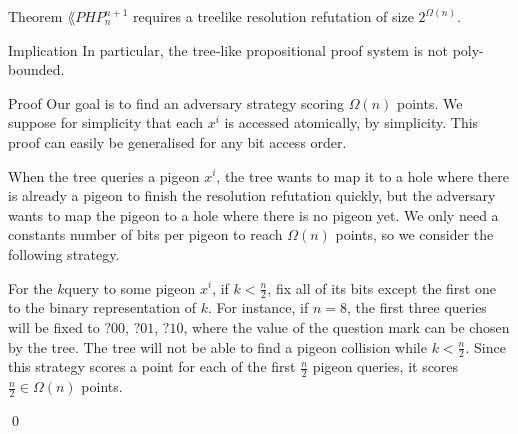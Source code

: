 \documentclass[a4paper]{article}
\begin{document}
\begin{parag}{Theorem}
    $\lang{PHP}_n^{n+1}$ requires a treelike resolution refutation of size $2^{\Omega\left(n\right)}$.

    \begin{subparag}{Implication}
        In particular, the tree-like propositional proof system is not poly-bounded.
    \end{subparag}

    \begin{subparag}{Proof}
        Our goal is to find an adversary strategy scoring $\Omega\left(n\right)$ points. We suppose for simplicity that each $x^i$ is accessed atomically, by simplicity. This proof can easily be generalised for any bit access order.

        When the tree queries a pigeon $x^i$, the tree wants to map it to a hole where there is already a pigeon to finish the resolution refutation quickly, but the adversary wants to map the pigeon to a hole where there is no pigeon yet. We only need a constants number of bits per pigeon to reach $\Omega\left(n\right)$ points, so we consider the following strategy. 

        For the $k$\Th query to some pigeon $x^i$, if $k < \frac{n}{2}$, fix all of its bits except the first one to the binary representation of $k$. For instance, if $n = 8$, the first three queries will be fixed to $?00$, $?01$, $?10$, where the value of the question mark can be chosen by the tree. The tree will not be able to find a pigeon collision while $k < \frac{n}{2}$. Since this strategy scores a point for each of the first $\frac{n}{2}$ pigeon queries, it scores $\frac{n}{2} \in \Omega\left(n\right)$ points.

        \qed
    \end{subparag}
\end{parag}
\end{document}
